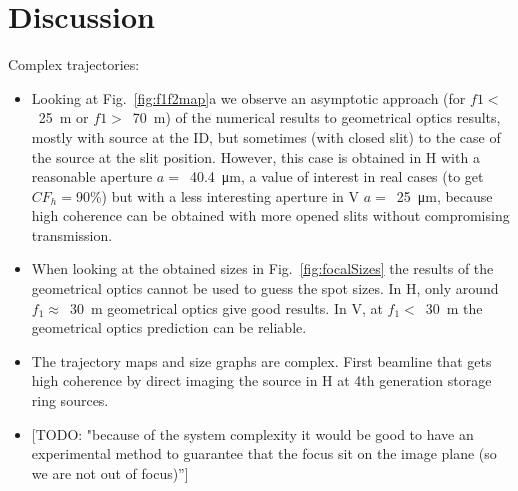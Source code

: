 \documentclass{iucr}              %
\newcommand{\todo}[1]{{\color{red}[TODO: "#1'']}}
\newcommand{\ingreen}[1]{{\color{green}#1}}
\begin{document}
\newpage






    
        




\section{Discussion}
\label{sec:discussion}

Complex trajectories: 

\begin{itemize}
    \item Looking at Fig.~\ref{fig:f1f2map}a we observe an asymptotic approach (for $f1<$~\SI{25}{\meter} or $f1>$~\SI{70}{\meter}) of the numerical results to geometrical optics results, mostly with source at the ID, but sometimes (with closed slit) to the case of the source at the slit position. However, this case is obtained in H with a reasonable aperture $a=$~\SI{40.4}{\micro\meter}, a value of interest in real cases (to get $CF_h=$90\%) but with a less interesting aperture in V $a=$~\SI{25}{\micro\meter}, because high coherence can be obtained with more opened slits without compromising transmission. 
    \item When looking at the obtained sizes in Fig.~\ref{fig:focalSizes} the results of the geometrical optics cannot be used to guess the spot sizes. In H, only around $f_1\approx$~\SI{30}{\meter} geometrical optics give good results. In V, at  $f_1 <$~\SI{30}{\meter} the geometrical optics prediction can be reliable. 
    \item The trajectory maps and size graphs are complex. First beamline that gets high coherence by direct imaging the source in H at 4th generation storage ring sources. 
    \item \todo{because of the system complexity it would be good to have an experimental method to guarantee that the focus sit on the image plane (so we are not out of focus)}
\end{itemize}
\end{document}
